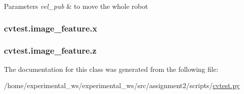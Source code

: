 \begin{DoxyParams}{Parameters}
{\em vel\+\_\+pub} & to move the whole robot \\
\hline
\end{DoxyParams}
\subsubsection[{\texorpdfstring{x}{x}}]{\setlength{\rightskip}{0pt plus 5cm}cvtest.\+image\+\_\+feature.\+x\hspace{0.3cm}{\ttfamily [static]}}\hypertarget{classcvtest_1_1image__feature_a81375475ba17a89b219d6627ab1b88f7}{}\label{classcvtest_1_1image__feature_a81375475ba17a89b219d6627ab1b88f7}
\subsubsection[{\texorpdfstring{z}{z}}]{\setlength{\rightskip}{0pt plus 5cm}cvtest.\+image\+\_\+feature.\+z\hspace{0.3cm}{\ttfamily [static]}}\hypertarget{classcvtest_1_1image__feature_ad4621c94d0673c73f05da9f2c5c1d405}{}\label{classcvtest_1_1image__feature_ad4621c94d0673c73f05da9f2c5c1d405}


The documentation for this class was generated from the following file\+:\begin{DoxyCompactItemize}
\item 
/home/experimental\+\_\+ws/experimental\+\_\+ws/src/assignment2/scripts/\hyperlink{cvtest_8py}{cvtest.\+py}\end{DoxyCompactItemize}
